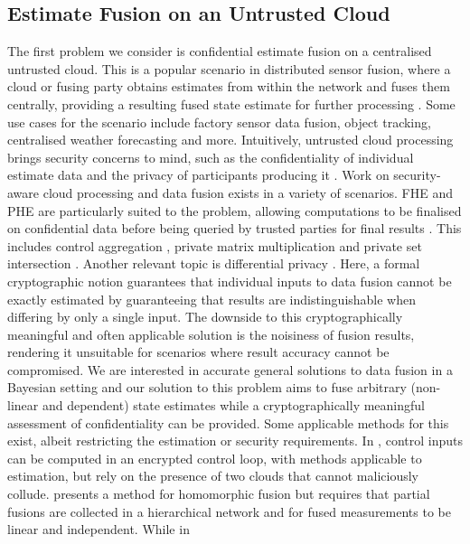 \subsection{Estimate Fusion on an Untrusted Cloud}\label{subsec:intro:conf_est_fusion}
The first problem we consider is confidential estimate fusion on a centralised untrusted cloud. This is a popular scenario in distributed sensor fusion, where a cloud or fusing party obtains estimates from within the network and fuses them centrally, providing a resulting fused state estimate for further processing \cite{ligginsDistributedFusionArchitectures1997,bar-shalomEffectCommonProcess1986,heRangeFreeLocalizationSchemes2003,congOrderInsensitiveSequential2016,yonggangxuEstimationUncontrolledControlled2005,rosenthalSchedulingMeasurementTransmission2018}. Some use cases for the scenario include factory sensor data fusion, object tracking, centralised weather forecasting and more. Intuitively, untrusted cloud processing brings security concerns to mind, such as the confidentiality of individual estimate data and the privacy of participants producing it \cite{renSecurityChallengesPublic2012,leiOutsourcingLargeMatrix2013,nandakumarProtectingGridTopology2019,zhangSecureDotProduct2017,schulzedarupEncryptedControlNetworked2021}. Work on security-aware cloud processing and data fusion exists in a variety of scenarios. FHE and PHE are particularly suited to the problem, allowing computations to be finalised on confidential data before being queried by trusted parties for final results \cite{lopez-altOntheflyMultipartyComputation2012,poteyHomomorphicEncryptionSecurity2016,zhaoCloudComputingSecurity2014}. This includes control aggregation \cite{alexandruEncryptedCooperativeControl2019}, private matrix multiplication \cite{kogisoCyberSecurityEnhancementNetworked2015} and private set intersection \cite{kerschbaumOutsourcedPrivateSet2012}. Another relevant topic is differential privacy \cite{dworkDifferentialPrivacySurvey2008,wilsonDifferentiallyPrivateSQL2020}. Here, a formal cryptographic notion guarantees that individual inputs to data fusion cannot be exactly estimated by guaranteeing that results are indistinguishable when differing by only a single input. The downside to this cryptographically meaningful and often applicable solution is the noisiness of fusion results, rendering it unsuitable for scenarios where result accuracy cannot be compromised. We are interested in accurate general solutions to data fusion in a Bayesian setting and our solution to this problem aims to fuse arbitrary (non-linear and dependent) state estimates while a cryptographically meaningful assessment of confidentiality can be provided. Some applicable methods for this exist, albeit restricting the estimation or security requirements. In \cite{daruEncryptedCloudbasedControl2019}, control inputs can be computed in an encrypted control loop, with methods applicable to estimation, but rely on the presence of two clouds that cannot maliciously collude. \cite{aristovEncryptedMultisensorInformation2018} presents a method for homomorphic fusion but requires that partial fusions are collected in a hierarchical network and for fused measurements to be linear and independent. While in 